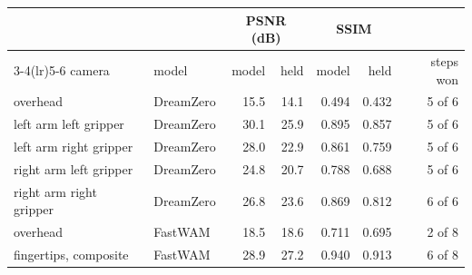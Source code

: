 \begin{tabular}{llrrrrr}
\toprule
& & \multicolumn{2}{c}{PSNR (dB)} & \multicolumn{2}{c}{SSIM} & \\
\cmidrule(lr){3-4}\cmidrule(lr){5-6}
camera & model & model & held & model & held & steps won \\
\midrule
overhead & DreamZero & 15.5 & 14.1 & 0.494 & 0.432 & 5 of 6 \\
left arm left gripper & DreamZero & 30.1 & 25.9 & 0.895 & 0.857 & 5 of 6 \\
left arm right gripper & DreamZero & 28.0 & 22.9 & 0.861 & 0.759 & 5 of 6 \\
right arm left gripper & DreamZero & 24.8 & 20.7 & 0.788 & 0.688 & 5 of 6 \\
right arm right gripper & DreamZero & 26.8 & 23.6 & 0.869 & 0.812 & 6 of 6 \\
overhead & FastWAM & 18.5 & 18.6 & 0.711 & 0.695 & 2 of 8 \\
fingertips, composite & FastWAM & 28.9 & 27.2 & 0.940 & 0.913 & 6 of 8 \\
\bottomrule
\end{tabular}
